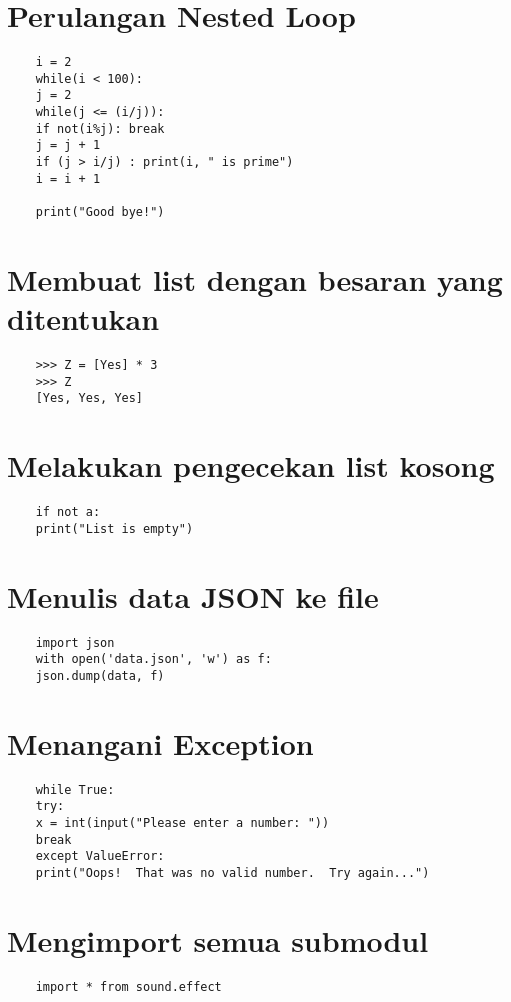 \documentclass[12pt]{article} %
\begin{document}
\section{Perulangan Nested Loop}
\begin{lstlisting}
	i = 2
	while(i < 100):
	j = 2
	while(j <= (i/j)):
	if not(i%j): break
	j = j + 1
	if (j > i/j) : print(i, " is prime")
	i = i + 1
	
	print("Good bye!")
\end{lstlisting}

\section {Membuat list dengan besaran yang ditentukan}
\begin{lstlisting}
	>>> Z = [Yes] * 3
	>>> Z
	[Yes, Yes, Yes]
\end{lstlisting}

\section {Melakukan pengecekan list kosong}
\begin{lstlisting}
	if not a:
	print("List is empty")
\end{lstlisting}

\section {Menulis data JSON ke file}
\begin{lstlisting}
	import json
	with open('data.json', 'w') as f:
	json.dump(data, f)
\end{lstlisting}

\section{Menangani Exception}
\begin{lstlisting}
	while True:
	try:
	x = int(input("Please enter a number: "))
	break
	except ValueError:
	print("Oops!  That was no valid number.  Try again...")

\end{lstlisting}

\section{Mengimport semua submodul}
\begin{lstlisting}
	import * from sound.effect
\end{lstlisting}
\end{document}
